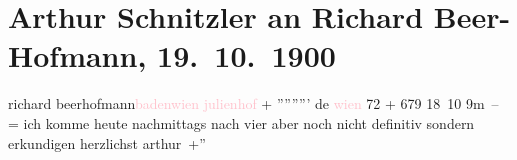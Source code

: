 

               \section[Arthur Schnitzler an Richard Beer-Hofmann, 19. 10. 1900]{ Arthur Schnitzler an Richard Beer-Hofmann,
                    19. 10. 1900}\nopagebreak{}\rehead{ }\normalsize\beginnumbering{} \toendnotes[C]{\smallbreak\pagebreak[2]} 
\pstart{}{\pb}richard beerhofmann\pend{}\pstart{}\textcolor{pink}{badenwien julienhof}{}\ledrightnote{\textcolor{pink}{Julienhof}}\pend{}{\bigskip}\pstart
           \noindent{}{\pb}+ ''''''''' de \textcolor{pink}{wien}{}\ledrightnote{\textcolor{pink}{Wien}} 72 + 679 18 10{ }9m –
                    \pend
           \pstart
           = ich komme heute nachmittags nach vier aber noch nicht definitiv sondern
                    erkundigen herzlichst \spacefill\mbox{arthur +''}\pend
           \endnumbering{}  
      